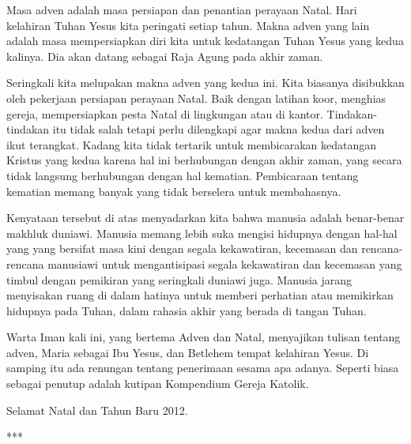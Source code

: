 \newpage



Masa adven adalah masa persiapan dan penantian perayaan Natal. Hari kelahiran Tuhan Yesus kita peringati setiap tahun. Makna adven yang lain adalah masa mempersiapkan diri kita untuk kedatangan Tuhan Yesus yang kedua kalinya. Dia akan datang sebagai Raja Agung pada akhir zaman. 

Seringkali kita melupakan makna adven yang kedua ini. Kita biasanya disibukkan oleh pekerjaan persiapan perayaan Natal. Baik dengan latihan koor, menghias gereja, mempersiapkan pesta Natal di lingkungan atau di kantor. Tindakan-tindakan itu tidak salah tetapi perlu dilengkapi agar makna kedua dari adven ikut terangkat. Kadang kita tidak tertarik untuk membicarakan kedatangan Kristus yang kedua karena hal ini berhubungan dengan akhir zaman, yang secara tidak langsung berhubungan dengan hal kematian. Pembicaraan tentang kematian memang banyak yang tidak berselera untuk membahasnya.

Kenyataan tersebut di atas menyadarkan kita bahwa manusia adalah benar-benar makhluk duniawi. Manusia memang lebih suka mengisi hidupnya dengan hal-hal yang yang bersifat masa kini dengan segala kekawatiran, kecemasan dan rencana-rencana manusiawi untuk mengantisipasi segala kekawatiran dan kecemasan yang timbul dengan pemikiran yang seringkali duniawi juga. Manusia jarang menyisakan ruang di dalam hatinya untuk memberi perhatian atau memikirkan hidupnya pada Tuhan, dalam rahasia akhir yang berada di tangan Tuhan.

Warta Iman kali ini, yang bertema Adven dan Natal, menyajikan tulisan tentang adven, Maria sebagai Ibu Yesus, dan Betlehem tempat kelahiran Yesus. Di samping itu ada renungan tentang penerimaan sesama apa adanya. Seperti biasa sebagai penutup adalah kutipan Kompendium Gereja Katolik.

Selamat Natal dan Tahun Baru 2012.
\begin{center}***\end{center} 

\vfill



